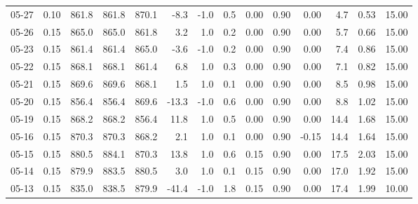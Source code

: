 \begin{threeparttable}
{\begin{tabular}{lrrrrrrrrrrrrr}
  05-27 &     0.10 & 861.8 & 861.8 & 870.1 &       -8.3 &                     -1.0 &                 0.5 &       0.00 &      0.90 &           0.00 &              4.7 &            0.53 &                  15.00 \\
  05-26 &     0.15 & 865.0 & 865.0 & 861.8 &        3.2 &                      1.0 &                 0.2 &       0.00 &      0.90 &           0.00 &              5.7 &            0.66 &                  15.00 \\
  05-23 &     0.15 & 861.4 & 861.4 & 865.0 &       -3.6 &                     -1.0 &                 0.2 &       0.00 &      0.90 &           0.00 &              7.4 &            0.86 &                  15.00 \\
  05-22 &     0.15 & 868.1 & 868.1 & 861.4 &        6.8 &                      1.0 &                 0.3 &       0.00 &      0.90 &           0.00 &              7.1 &            0.82 &                  15.00 \\
  05-21 &     0.15 & 869.6 & 869.6 & 868.1 &        1.5 &                      1.0 &                 0.1 &       0.00 &      0.90 &           0.00 &              8.5 &            0.98 &                  15.00 \\
  05-20 &     0.15 & 856.4 & 856.4 & 869.6 &      -13.3 &                     -1.0 &                 0.6 &       0.00 &      0.90 &           0.00 &              8.8 &            1.02 &                  15.00 \\
  05-19 &     0.15 & 868.2 & 868.2 & 856.4 &       11.8 &                      1.0 &                 0.5 &       0.00 &      0.90 &           0.00 &             14.4 &            1.68 &                  15.00 \\
  05-16 &     0.15 & 870.3 & 870.3 & 868.2 &        2.1 &                      1.0 &                 0.1 &       0.00 &      0.90 &          -0.15 &             14.4 &            1.64 &                  15.00 \\
  05-15 &     0.15 & 880.5 & 884.1 & 870.3 &       13.8 &                      1.0 &                 0.6 &       0.15 &      0.90 &           0.00 &             17.5 &            2.03 &                  15.00 \\
  05-14 &     0.15 & 879.9 & 883.5 & 880.5 &        3.0 &                      1.0 &                 0.1 &       0.15 &      0.90 &           0.00 &             17.0 &            1.92 &                  15.00 \\
  05-13 &     0.15 & 835.0 & 838.5 & 879.9 &      -41.4 &                     -1.0 &                 1.8 &       0.15 &      0.90 &           0.00 &             17.4 &            1.99 &                  10.00 \\

\end{tabular}}
\end{threeparttable}
